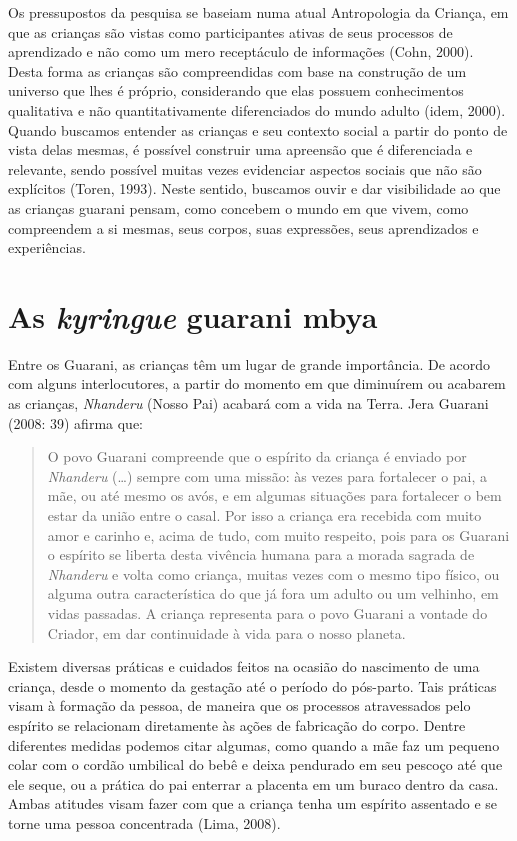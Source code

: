 Os pressupostos da pesquisa se baseiam numa atual Antropologia da
Criança, em que as crianças são vistas como participantes ativas de
seus processos de aprendizado e não como um mero receptáculo de
informações (Cohn, 2000). Desta forma as crianças são compreendidas com
base na construção de um universo que lhes é próprio, considerando que
elas possuem conhecimentos qualitativa e não quantitativamente
diferenciados do mundo adulto (idem, 2000). Quando buscamos entender as
crianças e seu contexto social a partir do ponto de vista delas mesmas,
é possível construir uma apreensão que é diferenciada e relevante,
sendo possível muitas vezes evidenciar aspectos sociais que não são
explícitos (Toren, 1993). Neste sentido, buscamos ouvir e dar
visibilidade ao que as crianças guarani pensam, como concebem o mundo
em que vivem, como compreendem a si mesmas, seus corpos, suas
expressões, seus aprendizados e experiências. 

\section{As \emph{kyringue} guarani mbya}
Entre os Guarani, as crianças têm um lugar de grande importância. De
acordo com alguns interlocutores, a partir do momento em que diminuírem
ou acabarem as crianças, \emph{Nhanderu} (Nosso Pai) acabará com a vida na
Terra. Jera Guarani (2008: 39) afirma que:

\begin{quotation}
O povo Guarani compreende que o espírito da criança é enviado por
\emph{Nhanderu} (\ldots{}) sempre com uma missão: às vezes para fortalecer o pai, a
mãe, ou até mesmo os avós, e em algumas situações para fortalecer o bem
estar da união entre o casal. Por isso a criança era recebida com muito
amor e carinho e, acima de tudo, com muito respeito, pois para os
Guarani o espírito se liberta desta vivência humana para a morada
sagrada de \emph{Nhanderu} e volta como criança, muitas vezes com o mesmo tipo
físico, ou alguma outra característica do que já fora um adulto ou um
velhinho, em vidas passadas. A criança representa para o povo Guarani a
vontade do Criador, em dar continuidade à vida para o nosso planeta.
\end{quotation}

Existem diversas práticas e cuidados feitos na ocasião do nascimento de
uma criança, desde o momento da gestação até o período do pós-parto.
Tais práticas visam à formação da pessoa, de maneira que os processos
atravessados pelo espírito se relacionam diretamente às ações de
fabricação do corpo. Dentre diferentes medidas podemos citar algumas,
como quando a mãe faz um pequeno colar com o cordão umbilical do bebê e
deixa pendurado em seu pescoço até que ele seque, ou a prática do pai
enterrar a placenta em um buraco dentro da casa. Ambas atitudes visam
fazer com que a criança tenha um espírito assentado e se torne uma
pessoa concentrada (Lima, 2008).

